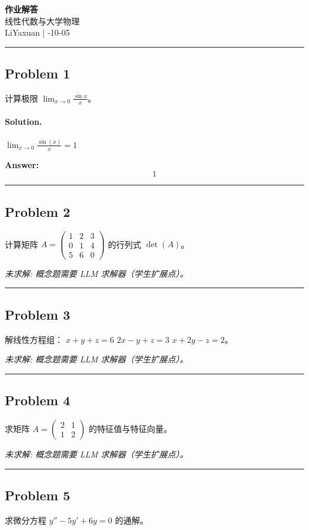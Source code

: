 \documentclass[12pt, a4paper]{article}
\newcommand{\problem}[1]{\subsection*{Problem #1}}
\newcommand{\solution}{\paragraph{Solution.}}
\begin{document}
\begin{center}
    {\LARGE\bfseries 作业解答} \\[0.5em]
    {\large 线性代数与大学物理} \\[0.3em]
    LiYaxuan \quad | -10-05
\end{center}

\hrule
\vspace{1em}
\problem{1}

计算极限 $\lim_{x \to 0} \frac{\sin x}{x}$。

\solution

$\lim_{x \to 0} \frac{\sin{\left(x \right)}}{x} = 1$

\textbf{Answer:}
\[\boxed{1}\]

\vspace{1em}
\hrule
\vspace{1em}

\problem{2}

计算矩阵 $A = \begin{pmatrix} 1 & 2 & 3 \\ 0 & 1 & 4 \\ 5 & 6 & 0 \end{pmatrix}$ 的行列式 $\det(A)$。

\textit{\color{red} 未求解: 概念题需要 LLM 求解器（学生扩展点）。}

\vspace{1em}
\hrule
\vspace{1em}

\problem{3}

解线性方程组：
$x + y + z = 6$
$2x - y + z = 3$
$x + 2y - z = 2$。

\textit{\color{red} 未求解: 概念题需要 LLM 求解器（学生扩展点）。}

\vspace{1em}
\hrule
\vspace{1em}

\problem{4}

求矩阵 $A = \begin{pmatrix} 2 & 1 \\ 1 & 2 \end{pmatrix}$ 的特征值与特征向量。

\textit{\color{red} 未求解: 概念题需要 LLM 求解器（学生扩展点）。}

\vspace{1em}
\hrule
\vspace{1em}

\problem{5}

求微分方程 $y'' - 5y' + 6y = 0$ 的通解。
\end{document}

